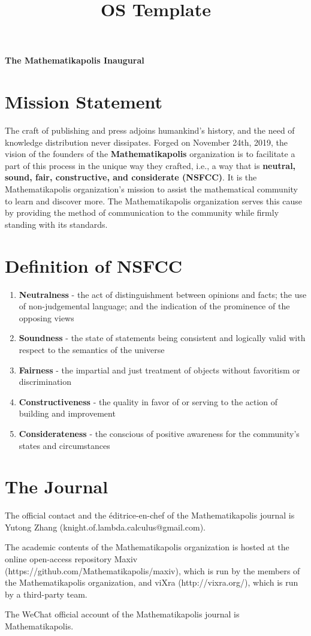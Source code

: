 \documentclass[10pt]{article}
\title{OS Template}
\author{}
\begin{document}
\renewcommand{\setminus}{\mathbin{\backslash}}

\begin{center}
\textbf{{\Huge The Mathematikapolis Inaugural}}
\end{center}

\section{Mission Statement}
The craft of publishing and press adjoins humankind's history, and the need of knowledge distribution never dissipates. Forged on November 24th, 2019, the vision of the founders of the \textbf{Mathematikapolis} organization is to facilitate a part of this process in the unique way they crafted, i.e., a way that is \textbf{neutral, sound, fair, constructive, and considerate (NSFCC)}. It is the Mathematikapolis organization's mission to assist the mathematical community to learn and discover more. The Mathematikapolis organization serves this cause by providing the method of communication to the community while firmly standing with its standards.

\section{Definition of NSFCC}
\begin{enumerate}
\item \textbf{Neutralness} - the act of distinguishment between opinions and facts; the use of non-judgemental language; and the indication of the prominence of the opposing views
\item \textbf{Soundness} - the state of statements being consistent and logically valid with respect to the semantics of the universe
\item \textbf{Fairness} - the impartial and just treatment of objects without favoritism or discrimination
\item \textbf{Constructiveness} - the quality in favor of or serving to the action of building and improvement
\item \textbf{Considerateness} - the conscious of positive awareness for the community's states and circumstances
\end{enumerate}

\section{The Journal}
The official contact and the éditrice-en-chef of the Mathematikapolis journal is Yutong Zhang (knight.of.lambda.calculus@gmail.com).

The academic contents of the Mathematikapolis organization is hosted at the online open-access repository Maxiv (https://github.com/Mathematikapolis/maxiv), which is run by the members of the Mathematikapolis organization, and viXra (http://vixra.org/), which is run by a third-party team.

The WeChat official account of the Mathematikapolis journal is Mathematikapolis.
\end{document}

